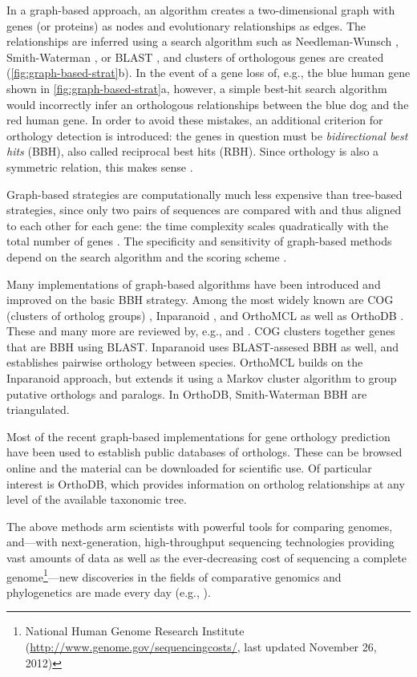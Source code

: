 In a graph-based approach, an algorithm creates a two-dimensional graph with
genes (or proteins) as nodes and evolutionary relationships as edges. The
relationships are inferred using a search algorithm such as Needleman-Wunsch
\citeyearpar{needleman1970}, Smith-Waterman \citeyearpar{smith1981}, or BLAST
\citep{altschul1990}, and clusters of orthologous genes are created
(\autoref{fig:graph-based-strat}b). In the event of a gene loss of, e.g., the
blue human gene shown in \autoref{fig:graph-based-strat}a, however, a simple
best-hit search algorithm would incorrectly infer an orthologous relationships
between the blue dog and the red human gene. In order to avoid these mistakes,
an additional criterion for orthology detection is introduced: the genes in
question must be \emph{bidirectional best hits} (BBH), also called reciprocal
best hits (RBH).  Since orthology is also a symmetric relation, this makes sense
.



Graph-based strategies are computationally much less expensive than tree-based
strategies, since only two pairs of sequences are compared with and thus aligned
to each other for each gene: the time complexity scales quadratically with the
total number of genes \citep{altenhoff2012-1}. The specificity and sensitivity
of graph-based methods depend on the search algorithm and the scoring scheme
\citep{hulsen2006}.

Many implementations of graph-based algorithms have been introduced and improved
on the basic BBH strategy. Among the most widely known are COG (clusters of
ortholog groups) \citep{tatusov2003}, Inparanoid \citep{ostlund2010}, and
OrthoMCL \citep{li2003} as well as OrthoDB \citep{waterhouse2011}. These and
many more are reviewed by, e.g., \citet{kuzniar2008} and \citet{forslund2011}.
COG clusters together genes that are BBH using BLAST. Inparanoid uses
BLAST-assesed BBH as well, and establishes pairwise orthology between
species. OrthoMCL builds on the Inparanoid approach, but extends it using a
Markov cluster algorithm to group putative orthologs and paralogs. In OrthoDB,
Smith-Waterman BBH are triangulated.

Most of the recent graph-based implementations for gene orthology prediction have been used to establish
public databases of orthologs. These can be browsed online and the material can
be downloaded for scientific use. Of particular interest is OrthoDB, which
provides information on ortholog relationships at any level of the available
taxonomic tree. 

The above methods arm scientists with powerful tools for comparing genomes,
and---with next-generation, high-throughput sequencing technologies providing
vast amounts of data as well as the ever-decreasing cost of sequencing a
complete genome\footnote{National Human Genome Research Institute
(\url{http://www.genome.gov/sequencingcosts/}, last updated November 26,
2012)}---new discoveries in the fields of comparative genomics and phylogenetics
are made every day (e.g., \citet{niehuis2012, bradbury2012}).


